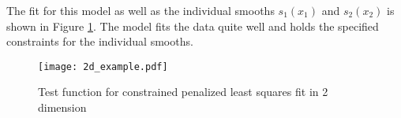 The fit for this model as well as the individual smooths $s_1(x_1)$ and $s_2(x_2)$ is shown in Figure \ref{fig:2d_example}. The model fits the data quite well and holds the specified constraints for the individual smooths.
	
\begin{figure}[H]
\centering
\texttt{[image: 2d\_example.pdf]}
\caption{Test function for constrained penalized least squares fit in 2 dimension}
\label{fig:2d_example}
\end{figure}
